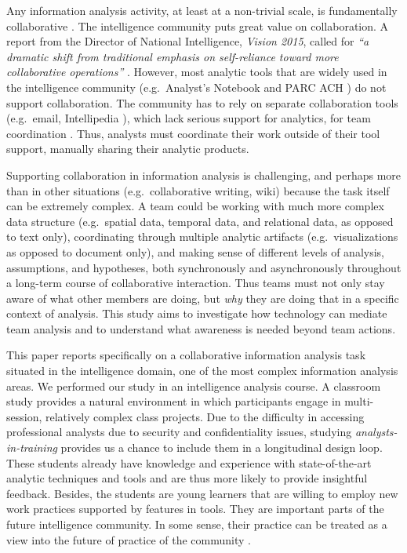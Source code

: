 Any information analysis activity, at least at a non-trivial scale, is
fundamentally collaborative \cite{Convertino2011}. The intelligence community
puts great value on collaboration. A report from the Director of National
Intelligence, \emph{Vision 2015},  called for \emph{``a dramatic shift from
traditional emphasis on self-reliance toward more collaborative operations''}
\cite[p.13]{Vision2015}. However, most analytic tools that are widely used in
the intelligence community (e.g.~Analyst's Notebook \cite{IBM} and PARC ACH
\cite{PARC}) do not support collaboration. The community has to rely on separate
collaboration tools (e.g.~email, Intellipedia \cite{Intelink2017}), which lack
serious support for analytics, for team coordination \cite{Treverton2016}. Thus,
analysts must coordinate their work outside of their tool support, manually
sharing their analytic products.

Supporting collaboration in information analysis is challenging, and perhaps
more than in other situations (e.g.~collaborative writing, wiki) because the task
itself can be extremely complex. A team could be working with much more complex
data structure (e.g.~spatial data, temporal data, and relational data, as
opposed to text only), coordinating through multiple analytic artifacts
(e.g.~visualizations as opposed to document only), and making
sense of different levels of analysis, assumptions, and hypotheses, both
synchronously and asynchronously throughout a long-term course of collaborative
interaction. Thus teams must not only stay aware of what other members are doing, but \emph{why} they are doing that in a specific context of analysis. This study aims to investigate how technology can mediate team analysis and to understand what awareness is needed beyond team actions.

This paper reports specifically on a collaborative information analysis task situated in the intelligence domain, one of the most complex information analysis areas. We performed our study in an intelligence analysis course.
A classroom study provides a natural environment in which participants engage
in multi-session, relatively complex class projects. Due to the difficulty in
accessing professional analysts due to security and confidentiality issues,
studying \emph{analysts-in-training} provides us a chance to include them in a
longitudinal design loop. These students already have knowledge and experience
with state-of-the-art analytic techniques and tools and are thus more likely to
provide insightful feedback. Besides, the students are young learners that are
willing to employ new work practices supported by features in tools. They are
important parts of the future intelligence community. In some sense, their
practice can be treated as a view into the future of practice of the community
\cite{Martin2014}.

